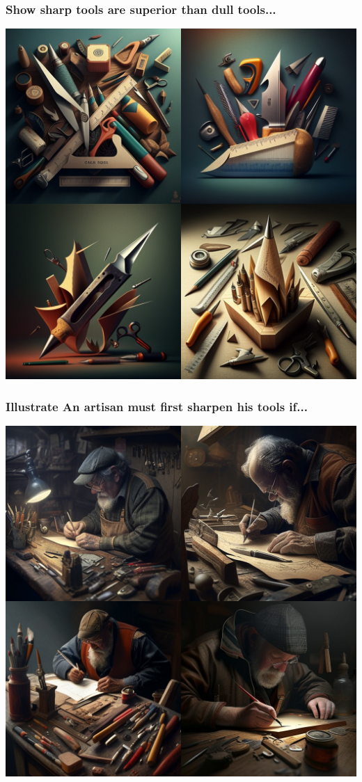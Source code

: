 \documentclass[9pt,table,xcolor=dvipsnames]{beamer}%
\theoremstyle{definition}
\theoremstyle{plain}
\begin{document}
\begin{frame}[fragile,t] %
  \frametitle{Show sharp tools are superior than dull tools...}
  \begin{center}
    \includegraphics[scale=0.22]{./figs/chenle02_Show_sharp_tools_are_superior_than_dull_tools_illustra.png}
  \end{center}
\end{frame}
\begin{frame}[fragile,t] %
  \frametitle{Illustrate An artisan must first sharpen his tools if...}
  \begin{center}
    \includegraphics[scale=0.22]{./figs/chenle02_Illustrate_An_artisan_must_first_sharpen_his_tools_if.png}
  \end{center}
\end{frame}
\end{document}
